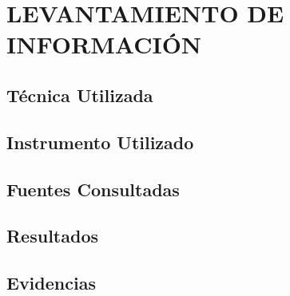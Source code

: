 \section{LEVANTAMIENTO DE INFORMACIÓN}

\subsection{Técnica Utilizada}





\subsection{Instrumento Utilizado}





\subsection{Fuentes Consultadas}





\subsection{Resultados}





\subsection{Evidencias}





